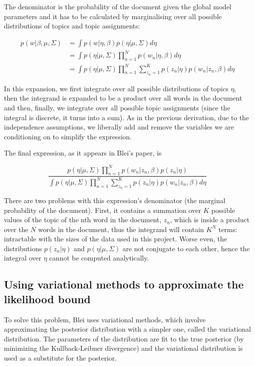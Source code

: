\documentclass[12pt,a4paper,twoside,openright]{report}
\begin{document}
The denominator is the probability of the document given the global model parameters and it has to be calculated by marginalising over all possible distributions of topics and topic assignments:

\begin{align}
p(w | \beta, \mu, \Sigma) & = \int p(w | \eta, \beta) p(\eta | \mu, \Sigma) d\eta \\
& =\int p(\eta | \mu, \Sigma)  \prod\limits_{n=1}^N p(w_n | \eta, \beta) d\eta \\
& =\int p(\eta | \mu, \Sigma)  \prod\limits_{n=1}^N \sum\limits_{z_n=1}^K p(z_n | \eta) p(w_n | z_n, \beta) d\eta
\end{align}

In this expansion, we first integrate over all possible distributions of topics $\eta$, then the integrand is expanded to be a product over all words in the document and then, finally, we integrate over all possible topic assignments (since the integral is discrete, it turns into a sum). As in the previous derivation, due to the independence assumptions, we liberally add and remove the variables we are conditioning on to simplify the expression.

The final expression, as it appears in Blei's paper, is

\begin{equation}
\frac{p(\eta | \mu, \Sigma) \prod\limits_{n=1}^N p(w_n | z_n, \beta) p(z_n | \eta)}{\int p(\eta | \mu, \Sigma)  \prod\limits_{n=1}^N \sum\limits_{z_n=1}^K p(z_n | \eta) p(w_n | z_n, \beta) d\eta}
\end{equation}

There are two problems with this expression's denominator (the marginal probability of the document). First, it contains a summation over $K$ possible values of the topic of the nth word in the document, $z_n$, which is inside a product over the $N$ words in the document, thus the integrand will contain $K^N$ terms: intractable with the sizes of the data used in this project. Worse even, the distributions $p(z_n | \eta)$ and $p(\eta | \mu, \Sigma)$ are not conjugate to each other, hence the integral over $\eta$ cannot be computed analytically.

\subsection{Using variational methods to approximate the likelihood bound}

To solve this problem, Blei uses variational methods, which involve approximating the posterior distribution with a simpler one, called the variational distribution. The parameters of the distribution are fit to the true posterior (by minimizing the Kullback-Leibner divergence) and the variational distribution is used as a substitute for the posterior.
\end{document}
